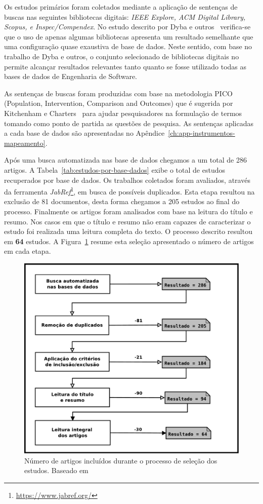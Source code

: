 Os estudos primários foram coletados mediante a aplicação de sentenças de buscas
nas seguintes bibliotecas digitais: \textit{IEEE Explore, ACM Digital Library,
	Scopus, e Inspec/Compendex}. No estudo descrito por Dyba e
outros~\cite{dybaa2007applying} verifica-se que o uso de apenas algumas
bibliotecas apresenta um resultado semelhante que uma configuração quase
exaustiva de base de dados. Neste sentido, com base no trabalho de Dyba e
outros, o conjunto selecionado de bibliotecas digitais no permite alcançar
resultados relevantes tanto quanto se fosse utilizado todas as bases de dados de
Engenharia de Software.

As sentenças de buscas foram produzidas com base na metodologia PICO
(Population, Intervention, Comparison and Outcomes) que é sugerida por
Kitchenham e Charters~\cite{keele2007guidelines} para ajudar pesquisadores na
formulação de termos tomando como ponto de partida as questões de pesquisa. As
sentenças aplicadas a cada base de dados são apresentadas no
Apêndice~\ref{ch:app-instrumentos-mapeamento}.

Após uma busca automatizada nas base de dados chegamos a um total de 286
artigos. A Tabela~\ref{tab:estudos-por-base-dados} exibe o total de estudos
recuperados por base de dados.  Os trabalhos coletados foram avaliados, através
da ferramenta \textit{JabRef}\footnote{\url{https://www.jabref.org/}}, em busca
de possíveis duplicados. Esta etapa resultou na exclusão de 81 documentos, desta
forma chegamos a 205 estudos ao final do processo. Finalmente os artigos foram
analisados com base na leitura do título e resumo. Nos casos em que o título e
resumo não eram capazes de caracterizar o estudo foi realizada uma leitura
completa do texto. O processo descrito resultou em \textbf{64} estudos. A
Figura~\ref{fig:diagrama-processo-selecao} resume esta seleção apresentado o
número de artigos em cada etapa.

\begin{figure} \centering \includegraphics[width=0.75\linewidth]
	{./chapter-mapeamento-sistematico/img/diagrama-processo-selecao.pdf}
	\caption{Número de artigos incluídos durante o processo de seleção dos
		estudos. Baseado
		em~\cite{Petersen2015}}\label{fig:diagrama-processo-selecao}
\end{figure}

